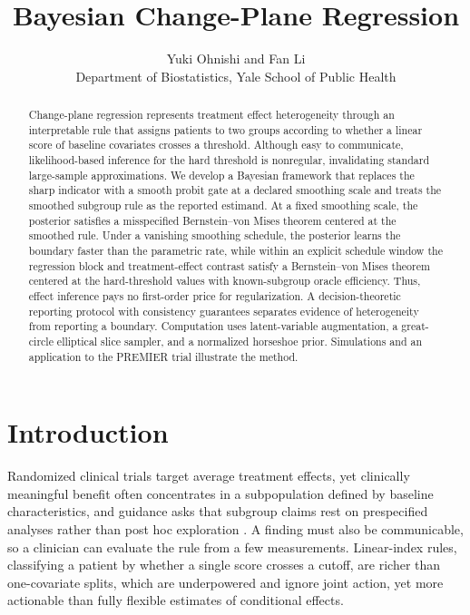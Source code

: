 \documentclass[11pt]{article}
\theoremstyle{definition}
\theoremstyle{plain}
\begin{document}
\def\spacingset#1{\renewcommand{\baselinestretch}%
{#1}\small\normalsize} \spacingset{1}

\title{Bayesian Change-Plane Regression}
\author{Yuki Ohnishi and Fan Li\\
  Department of Biostatistics, 
  Yale School of Public Health}
\date{}
\maketitle

\begin{abstract}
Change-plane regression represents treatment effect heterogeneity through an interpretable rule that assigns patients to two groups according to whether a linear score of baseline covariates crosses a threshold. Although easy to communicate, likelihood-based inference for the hard threshold is nonregular, invalidating standard large-sample approximations. We develop a Bayesian framework that replaces the sharp indicator with a smooth probit gate at a declared smoothing scale and treats the smoothed subgroup rule as the reported estimand. At a fixed smoothing scale, the posterior satisfies a misspecified Bernstein--von Mises theorem centered at the smoothed rule. Under a vanishing smoothing schedule, the posterior learns the boundary faster than the parametric rate, while within an explicit schedule window the regression block and treatment-effect contrast satisfy a Bernstein--von Mises theorem centered at the hard-threshold values with known-subgroup oracle efficiency. Thus, effect inference pays no first-order price for regularization. A decision-theoretic reporting protocol with consistency guarantees separates evidence of heterogeneity from reporting a boundary. Computation uses latent-variable augmentation, a great-circle elliptical slice sampler, and a normalized horseshoe prior. Simulations and an application to the PREMIER trial illustrate the method.
\end{abstract}


\spacingset{1.1}

\section{Introduction}\label{sec:intro}

Randomized clinical trials target average treatment effects, yet clinically meaningful benefit often concentrates in a subpopulation defined by baseline characteristics, and guidance asks that subgroup claims rest on prespecified analyses rather than post hoc exploration \citep{ema2019subgroup, ich2019estimands}. A finding must also be communicable, so a clinician can evaluate the rule from a few measurements. Linear-index rules, classifying a patient by whether a single score crosses a cutoff, are richer than one-covariate splits, which are underpowered and ignore joint action, yet more actionable than fully flexible estimates of conditional effects.
\end{document}
